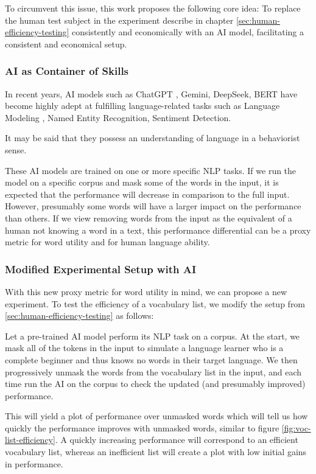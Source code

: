 To circumvent this issue, this work proposes the following core idea:
To replace the human test subject in the experiment describe in chapter \ref{sec:human-efficiency-testing} consistently and economically with an AI model, facilitating a consistent and economical setup.

\subsubsection{AI as Container of Skills}
In recent years, AI models such as ChatGPT , Gemini, DeepSeek, BERT have become highly adept at fulfilling language-related tasks such as Language Modeling , Named Entity Recognition, Sentiment Detection.

It may be said that they possess an understanding of language in a behaviorist sense.

These AI models are trained on one or more specific NLP tasks.
If we run the model on a specific corpus and mask some of the words in the input, it is expected that the performance will decrease in comparison to the full input.
However, presumably some words will have a larger impact on the performance than others.
If we view removing words from the input as the equivalent of a human not knowing a word in a text, this performance differential can be a proxy metric for word utility and for human language ability.

\subsubsection{Modified Experimental Setup with AI}
With this new proxy metric for word utility in mind, we can propose a new experiment.
To test the efficiency of a vocabulary list, we modify the setup from \ref{sec:human-efficiency-testing} as follows:

Let a pre-trained AI model perform its NLP task on a corpus.
At the start, we mask all of the tokens in the input to simulate a language learner who is a complete beginner and thus knows no words in their target language.
We then progressively unmask the words from the vocabulary list in the input, and each time run the AI on the corpus to check the updated (and presumably improved) performance.

This will yield a plot of performance over unmasked words which will tell us how quickly the performance improves with unmasked words, similar to figure \ref{fig:voc-list-efficiency}.
A quickly increasing performance will correspond to an efficient vocabulary list, whereas an inefficient list will create a plot with low initial gains in performance.


